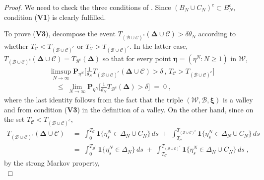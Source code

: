 \documentclass[reqno]{amsart}
\begin{document}
\begin{proof}
We need to check the three conditions of \cite[Definition 2.1]{bl2}. 
Since $(B_N \cup C_N)^c \subset B_N^c$, condition ({\bf V1}) is
clearly fulfilled.

To prove ({\bf V3}), decompose the event $T_{({{\mathscr B}} \cup {{\mathscr C}})^c}
({{\boldsymbol \Delta}} \cup {{\mathscr C}}) > \delta \theta_N$ according to whether $T_{{{\mathscr C}}} < T_{({{\mathscr B}} \cup {{\mathscr C}})^{c}}$ or $T_{{{\mathscr C}}} > T_{({{\mathscr B}} \cup {{\mathscr C}})^{c}}$. In the latter case, $T_{({{\mathscr B}} \cup {{\mathscr C}})^c} ({{\boldsymbol \Delta}}
\cup {{\mathscr C}}) = T_{{{\mathscr B}}^c} ({{\boldsymbol \Delta}})$ so that for every point ${{\boldsymbol \eta}} = (\eta^N : N\ge 1)$ in ${{\mathscr W}}$,
\begin{equation*}
\begin{split}
& \limsup_{N\to\infty} {{\mathbf P}}_{\eta^N} \Big[ \frac 1{\theta_N} 
T_{({{\mathscr B}} \cup {{\mathscr C}})^c} ({{\boldsymbol \Delta}} \cup {{\mathscr C}}) > \delta 
\, , \, T_{{{\mathscr C}}} > T_{({{\mathscr B}} \cup {{\mathscr C}})^{c}}  \Big] \\
&\quad \le\; \lim_{N\to\infty} {{\mathbf P}}_{\eta^N} \Big[ \frac 1{\theta_N} 
T_{{{\mathscr B}}^c} ({{\boldsymbol \Delta}}) > \delta \Big] \;=\; 0  \; , 
\end{split}
\end{equation*}
where the last identity follows from the fact that the triple $({{\mathscr W}},
{{\mathscr B}}, {{\boldsymbol \xi}})$ is a valley and from condition ({\bf V3}) in the
definition of a valley. On the other hand, since on the set $T_{{{\mathscr C}}}
< T_{({{\mathscr B}} \cup {{\mathscr C}})^{c}}$,
\begin{equation*}
\begin{split}
T_{({{\mathscr B}} \cup {{\mathscr C}})^c} ({{\boldsymbol \Delta}} \cup {{\mathscr C}}) 
\; & =\; \int_0^{T_{{{\mathscr C}}}} {{\mathbf 1}}\{ \eta^N_s \in \Delta_N \cup
C_N\} \, ds \;+\; \int_{T_{{{\mathscr C}}}} ^{T_{({{\mathscr B}} \cup {{\mathscr C}})^c}} 
{{\mathbf 1}}\{ \eta^N_s \in \Delta_N \cup C_N\} \, ds \\
& =\; \int_0^{T_{{{\mathscr B}}^c}} {{\mathbf 1}}\{ \eta^N_s \in \Delta_N\} 
\, ds \;+\; \int_{T_{{{\mathscr C}}}} ^{T_{({{\mathscr B}} \cup {{\mathscr C}})^c}} 
{{\mathbf 1}}\{ \eta^N_s \in \Delta_N \cup C_N\} \, ds\;,
\end{split}
\end{equation*}
by the strong Markov property,
\begin{equation*}

\end{equation*}
\end{proof}
\end{document}
